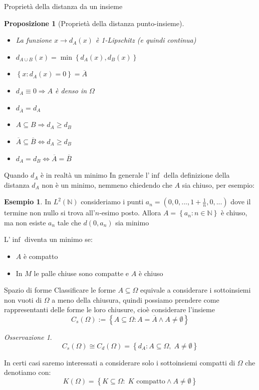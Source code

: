 \documentclass{beamer}
\newcounter{counter1}
\theoremstyle{plain}
\newtheorem{mypro}[counter1]{Proposizione}
\theoremstyle{definition}
\newtheorem{myes}[counter1]{Esempio}
\theoremstyle{remark}
\newtheorem{myoss}[counter1]{Osservazione}
\newcommand{\obar}[1]{\overline{#1}}
\newcommand{\set}[1]{\left\{#1\right\}}
\begin{document}
\begin{frame}{Proprietà della distanza da un insieme}
  \begin{mypro}[Proprietà della distanza punto-insieme]
    \begin{itemize}
    \item La funzione $x \rightarrow d_A(x)$ è 1-Lipschitz (e quindi
      continua)
    \item $d_{A\cup B}(x) = \min\set{d_A(x),d_B(x)}$
    \item $\set{x:d_A(x) = 0} = \obar A$
    \item $d_A \equiv 0 \Rightarrow A$ è denso in $\Omega$
    \item $d_{\obar A} = d_A$
    \item $A\subseteq B \Rightarrow d_A \ge d_B$
    \item $\obar{ A} \subseteq \obar B \Leftrightarrow d_A \ge d_B$
    \item $d_A = d_B \Leftrightarrow \obar A = \obar B$
    \end{itemize}
  \end{mypro}
\end{frame}

\begin{frame}{Quando $d_A$ \`e in realt\`a un minimo}
  In generale l'$\inf$ della definizione della distanza $d_A$ non \`e
  un minimo, nemmeno chiedendo che $A$ sia chiuso, per esempio:
  \begin{myes}
    In $L^2(\mathbb{N})$ consideriamo i punti $a_n = ( 0, 0, ..., 1 +
    \frac{1}{n} , 0, ...)$ dove il termine non nullo si trova
    all'$n$-esimo posto. Allora $A = \set{ a_n : n\in \mathbb{N}}$ \`e
    chiuso, ma non esiste $a_n$ tale che $d(0,a_n)$ sia minimo
  \end{myes}

  L'$\inf$ diventa un minimo se:
  \begin{itemize}
  \item $A$ \`e compatto
  \item In $M$ le palle chiuse sono compatte e $A$ è chiuso
  \end{itemize}
\end{frame}

\begin{frame}{Spazio di forme}
  Classificare le forme $A \subseteq \Omega$ equivale a considerare i
  sottoinsiemi non vuoti di $\Omega$ a meno della chiusura, quindi
  possiamo prendere come rappresentanti delle forme le loro chiusure,
  cioè considerare l'insieme
  \[ C_s(\Omega) := \set{ A \subseteq \Omega : A = \obar A \wedge A
    \neq \emptyset } \]

  \begin{myoss}
    \[ C_s(\Omega) \cong C_d(\Omega) = \set{d_A : A \subseteq \Omega,\;
      A \neq \emptyset} \]
  \end{myoss}
  \vfill
  In certi casi saremo interessati a considerare solo i sottoinsiemi
  compatti di $\Omega$ che denotiamo con:
  \[ K(\Omega) = \set{K\subseteq \Omega :\; K \text{ compatto} \wedge
    A \neq \emptyset} \]
\end{frame}
\end{document}
